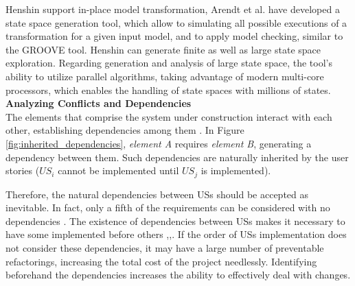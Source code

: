 Henshin support in-place model transformation, Arendt et al. have developed a state space generation tool, which allow to simulating all possible executions of a transformation for a given input model, and to apply model checking, similar to the GROOVE \cite{kastenberg2006model} tool. Henshin can generate finite as well as large state space exploration. Regarding generation and analysis of large state space, the tool’s ability to utilize parallel algorithms, taking advantage of modern multi-core processors, which enables the handling of state spaces with millions of states. \\ 
\textbf{Analyzing Conﬂicts and Dependencies}\\ 
The elements that comprise the system under construction interact with each other, establishing dependencies among them \cite{kastenberg2006model}. In Figure \ref{fig:inherited_dependencies}, \emph{element A} requires \emph{element B}, generating a dependency between them. Such dependencies are naturally inherited by the user stories ($US_i$ 
cannot be implemented until $US_j$ is implemented). 

Therefore, the natural dependencies between USs should be accepted as inevitable. In fact, only a fifth of the requirements can be considered with no dependencies \cite{carlshamre2001industrial}. The existence of dependencies between USs makes it necessary to have some implemented before others \cite{carlshamre2001industrial},\cite{Greer2004},\cite{logue2008handling}. If the order of USs implementation does not consider these dependencies, it may have a large number of preventable refactorings, increasing the total cost of the project needlessly. Identifying beforehand the dependencies increases the ability to effectively deal with changes. 

